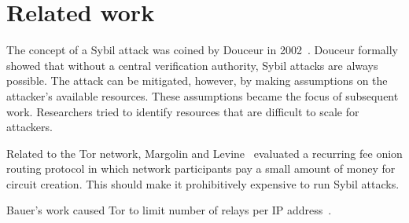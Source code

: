\section{Related work}
\label{sec:related_work}

The concept of a Sybil attack was coined by Douceur in 2002~\cite{Douceur2002a}.
Douceur formally showed that without a central verification authority,
Sybil attacks are always possible.  The attack can be mitigated, however, by
making assumptions on the attacker's available resources.  These assumptions
became the focus of subsequent work.  Researchers tried to identify resources
that are difficult to scale for attackers.

\cite{Li2012a,Borisov2006a,Danezis2009a,Yu2006a,Wolchok2010a,Wang2012a,Liu2015a}

Related to the Tor network, Margolin and Levine~\cite{Margolin2008a} evaluated
a recurring fee onion routing protocol in which network participants pay a
small amount of money for circuit creation.  This should make it prohibitively
expensive to run Sybil attacks.

Bauer's work caused Tor to limit number of relays per IP
address~\cite{Bauer2007a}.
